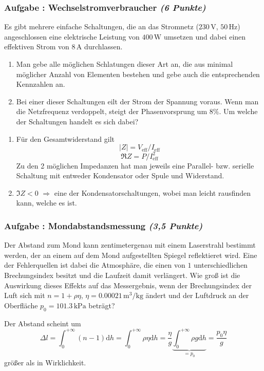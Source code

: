 \documentclass[12pt,a4paper]{article}
\newcommand{\unit}[1]{\,\mathrm{#1}}
\newcommand{\dif}{\mathrm{d}}
\newenvironment{abcenum}{\renewcommand{\labelenumi}{(\alph{enumi})} \begin{enumerate}}{\end{enumerate}\renewcommand{\labelenumi}{\theenumi .}}
\newcounter{numlabel}
\newenvironment{problem}[2]{\stepcounter{numlabel} \vspace{1ex} \subsubsection*{Aufgabe \the\value{numlabel}: #1 \emph{(#2 Punkte)}} \renewcommand{\Currentlabel}{Aufgabe \the\value{numlabel}: #1}}{

}
\begin{document}
\begin{problem}{Wechselstromverbraucher}{6}
Es gibt mehrere einfache Schaltungen, die an das Stromnetz ($230 \unit{V}$, $50 \unit{Hz}$) angeschlossen eine elektrische Leistung von $400 \unit{W}$ umsetzen und dabei einen effektiven Strom von $8 \unit{A}$ durchlassen.
\begin{abcenum}
\item Man gebe alle möglichen Schlatungen dieser Art an, die aus minimal möglicher Anzahl von Elementen bestehen und gebe auch die entsprechenden Kennzahlen an.
\item Bei einer dieser Schaltungen eilt der Strom der Spannung voraus. Wenn man die Netzfrequenz verdoppelt, steigt der Phasenvorsprung um $8\%$. Um welche der Schaltungen handelt es sich dabei?
\end{abcenum}

\begin{solution}
\begin{abcenum}
\item Für den Gesamtwiderstand gilt
\[
|Z| = V_\mathrm{eff} / I_\mathrm{eff}
\]
\[
\Re Z = P / I_\mathrm{eff}^2
\]
Zu den 2 möglichen Impedanzen hat man jeweils eine Parallel- bzw. serielle Schaltung mit entweder Kondensator oder Spule und Widerstand.
\item $\Im Z < 0$ $\Rightarrow$ eine der Kondensatorschaltungen, wobei man leicht rausfinden kann, welche es ist.
\end{abcenum}
\end{solution}
\end{problem}


\begin{problem}{Mondabstandsmessung}{3,5}
Der Abstand zum Mond kann zentimetergenau mit einem Laserstrahl bestimmt werden, der an einem auf dem Mond aufgestellten Spiegel reflektieret wird. Eine der Fehlerquellen ist dabei die Atmosphäre, die einen von $1$ unterschiedlichen Brechungsindex besitzt und die Laufzeit damit verlängert. Wie groß ist die Auswirkung dieses Effekts auf das Messergebnis, wenn der Brechungsindex der Luft sich mit $n = 1 + \rho \eta$, $\eta = 0.00021 \unit{m^3/kg}$ ändert und der Luftdruck an der Oberfläche $p_0 = 101.3 \unit{kPa}$ beträgt?

\begin{solution}
Der Abstand scheint um
\[
\Delta l = \int_0^{+\infty} (n-1) \dif h = \int_0^{+\infty} \rho \eta \dif h = \frac{\eta}{g} \underbrace{\int_0^{+\infty} \rho g \dif h}_{=p_0} = \frac{p_0 \eta}{g}
\]
größer als in Wirklichkeit.
\end{solution}
\end{problem}
\end{document}
